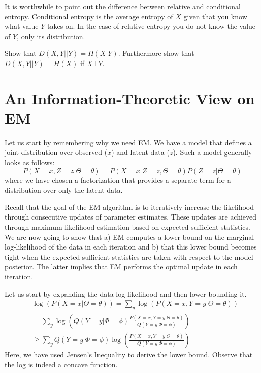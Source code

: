 It is worthwhile to point out the difference between relative and conditional entropy. Conditional entropy is the average entropy of $ X $ given that you
know what value $ Y $ takes on. In the case of relative entropy you do not know the value of $ Y $, only its distribution.

\begin{Exercise}
Show that $ D(X,Y||Y) = H(X|Y) $. Furthermore show that $ D(X,Y||Y) = H(X) $ if $ X\bot Y $.
\end{Exercise}


\section{An Information-Theoretic View on EM}

Let us start by remembering why we need EM. We have a model that defines a joint distribution
over observed ($ x $) and latent data ($ z $). Such a model generally looks as follows:
\begin{equation}
P(X=x, Z=z | \Theta = \theta) = P(X=x|Z=z, \Theta=\theta) P(Z=z|\Theta = \theta)
\end{equation}
where we have chosen a factorization that provides a separate term for a distribution over only the
latent data.

Recall that the goal of the EM algorithm is to iteratively increase the likelihood through consecutive
updates of parameter estimates. These updates are achieved through maximum likelihood estimation based
on expected sufficient statistics. We are now going to show that a) EM computes a lower bound on the
marginal log-likelihood of the data in each iteration and b) that this lower bound becomes tight when the
expected sufficient statistics are taken with respect to the model posterior. The latter implies that
EM performs the optimal update in each iteration.

Let us start by expanding the data log-likelihood and then lower-bounding it.
\begin{align}
&\log(P(X=x|\Theta=\theta)) = \sum_{y} \log(P(X=x, Y=y| \Theta = \theta))  \\
&= \sum_{y} \log\left(Q(Y=y|\Phi=\phi)\frac{P(X=x, Y=y| \Theta = \theta)}{Q(Y=y|\Phi=\phi)}\right) \\
&\geq \sum_{y} Q(Y=y|\Phi=\phi) \log\left(\frac{P(X=x, Y=y| \Theta = \theta)}{Q(Y=y|\Phi=\phi)}\right)
\label{eq:ELBO1}
\end{align}
Here, we have used \href{https://en.wikipedia.org/wiki/Jensen\%27s_inequality}{Jensen's Inequality} to
derive the lower bound. Observe that the log is indeed a concave function. 


